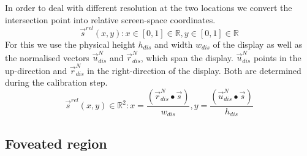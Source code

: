 \documentclass[]{article}
\begin{document}
%
In order to deal with different resolution at the two locations we convert the intersection point into relative screen-space coordinates.
%
\begin{equation*}
\overrightarrow{s}^{rel}(x, y)  : x \in \left[0,1 \right] \in \mathbb{R}, y \in \left[0,1 \right] \in \mathbb{R}
\end{equation*}
%
For this we use the physical height $h_{dis}$ and width $w_{dis}$ of the display as well as the normalised vectors $\overrightarrow{u}_{dis}^{N}$ and $\overrightarrow{r}_{dis}^{N}$, which span the display.
$\overrightarrow{u}_{dis}^{N}$ points in the up-direction and $\overrightarrow{r}_{dis}^{N}$ in the right-direction of the display.
Both are determined during the calibration step.
%
\begin{equation}\label{eq:implementation:tracking:relative} 
\overrightarrow{s}^{rel}(x, y) \in \mathbb{R}^{2} : x = \frac{\left( \overrightarrow{r}_{dis}^{N} \bullet \overrightarrow{s} \right) }{w_{dis}}, 
y = \frac{\left( \overrightarrow{u}_{dis}^{N} \bullet \overrightarrow{s} \right) }{h_{dis}}
\end{equation}
%

\subsection{Foveated region}
\end{document}
